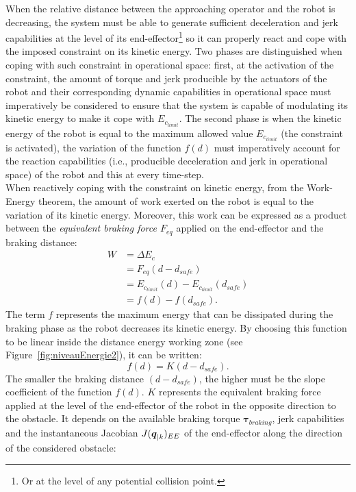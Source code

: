 When the relative distance between the approaching operator and the robot is decreasing, the system must be able to generate sufficient deceleration and jerk capabilities at the level of its end-effector\footnote{Or at the level of any potential collision point.} so it can properly react and cope with the imposed constraint on its kinetic energy. Two phases are distinguished when coping with such constraint in operational space: first, at the activation of the constraint, the amount of torque and jerk producible by the actuators of the robot and their corresponding dynamic capabilities in operational space must imperatively be considered to ensure that the system is capable of modulating its kinetic energy to make it cope with $E_{c_{limit}}$. The second phase is when the kinetic energy of the robot is equal to the maximum allowed value $E_{c_{limit}}$ (the constraint is activated), the variation of the function $f(d)$ must imperatively account for the reaction capabilities (i.e., producible deceleration and jerk in operational space) of the robot and this at every time-step. 
\\
When reactively coping with the constraint on kinetic energy, from the Work-Energy theorem, the amount of work exerted on the robot is equal to the variation of its kinetic energy. Moreover, this work can be expressed as a product between the \textit{equivalent braking force $F_{eq}$} applied on the end-effector and the braking distance:
\begin{equation}
\begin{split}
W &= \Delta E_c 
\\
&= F_{eq} (d-d_{safe}) 
\\
&= E_{c_{limit}}(d) - E_{c_{limit}}(d_{safe}) 
\\
&= f(d) - f(d_{safe}).
\end{split}
\end{equation}
The term $f$ represents the maximum energy that can be dissipated during the braking phase as the robot decreases its kinetic energy. By choosing this function to be linear inside the distance energy working zone (see Figure~\ref{fig:niveauEnergie2}), it can be written:
\begin{equation}
f(d) = K (d - d_{safe}).
\label{eq:k_fd}
\end{equation}
The smaller the braking distance $(d-d_{safe})$, the higher must be the slope coefficient of the function $f(d)$. $K$ represents the equivalent braking force applied at the level of the end-effector of the robot in the opposite direction to the obstacle. It depends on the available braking torque $\boldsymbol{\tau}_{braking}$, jerk capabilities and the instantaneous Jacobian $J(\mbox{\boldmath${q}$}_{|k})_{EE}$ of the end-effector along the direction of the considered obstacle: 

